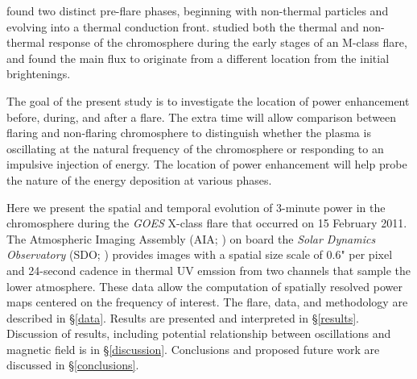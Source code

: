 \cite{Awasthi2018} found two distinct pre-flare phases,
beginning with non-thermal particles and evolving into a
thermal conduction front.
\cite{Fletcher2013b} studied both the thermal and non-thermal response
of the chromosphere during the early stages of an M-class flare,
and found the main flux to originate from a different location from
the initial brightenings.

The goal of the present study is to
investigate the location of power enhancement
before, during, and after a flare.
The extra time will allow comparison between flaring and non-flaring chromosphere
to distinguish whether the
plasma is oscillating at the natural frequency of the chromosphere
or responding to an impulsive injection of energy.
The location of power enhancement will help
probe the nature of the energy deposition at various phases.

Here we present the spatial and temporal evolution of 3-minute power in the
chromosphere during the
\textit{GOES} X-class flare that occurred on 15 February 2011.
The Atmospheric Imaging Assembly (AIA; \cite{Lemen2012}) on board the
\textit{Solar Dynamics Observatory} (SDO; \cite{Pesnell2012})
provides images
with a spatial size scale of 0.6" per pixel and 24-second cadence
in thermal UV emssion from
two channels that sample the lower atmosphere.
These data allow the computation of spatially resolved power maps centered
on the frequency of interest.
The flare, data, and methodology are described in \S\ref{data}.
Results are presented and interpreted in \S\ref{results}.
Discussion of results, including potential relationship between
oscillations and magnetic field is in \S\ref{discussion}.
Conclusions and proposed future work are discussed in
\S\ref{conclusions}.
